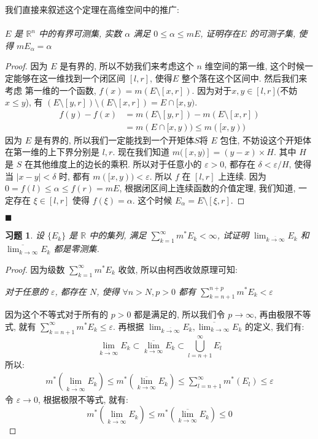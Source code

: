 \documentclass{article}
\newtheorem{exercise}{习题}
\newenvironment{solve}{{\flushleft\textit{解.}}}{\hfill $\blacksquare$}
\begin{document}
\begin{solve}
  我们直接来叙述这个定理在高维空间中的推广:
  \paragraph{}\emph{$E$ 是 $\mathbb{R}^n$ 中的有界可测集, 实数 $\alpha$ 满足 $0\leq \alpha\leq mE$, 证明存在$E$ 的可测子集, 使得 $mE_\alpha = \alpha$} 
  \begin{proof}
    因为 $E$ 是有界的, 所以不妨我们来考虑这个 $n$ 维空间的第一维, 这个时候一定能够在这一维找到一个闭区间 $[l, r]$, 使得$E$ 整个落在这个区间中.
    然后我们来考虑 第一维的一个函数, $f(x) = m(E\setminus [x, r])$.
    因为对于$x, y \in [l, r]$(不妨 $x \leq y$), 有 $(E\setminus[y, r]) \setminus (E\setminus[x, r]) = E\cap [x, y)$.
    \begin{align*}
      f(y) - f(x) &= m(E\setminus[y, r]) - m(E\setminus [x, r]) \\
      &= m(E\cap [x, y)) \leq m([x, y))
    \end{align*}
    因为 $E$ 是有界的, 所以我们一定能找到一个开矩体$S$将 $E$ 包住, 不妨设这个开矩体在第一维的上下界分别是 $l, r$.
    现在我们知道 $m([x, y)] = (y - x) \times H$. 其中 $H$ 是 $S$ 在其他维度上的边长的乘积. 所以对于任意小的 $\varepsilon > 0$, 都存在 $\delta < \varepsilon / H$, 使得当 $|x - y| < \delta$ 时, 都有 $m([x, y)) < \varepsilon$. 所以 $f$ 在 $[l, r]$ 上连续.
    因为 $0 = f(l) \leq \alpha \leq f(r) = mE$, 根据闭区间上连续函数的介值定理, 我们知道, 一定存在 $\xi\in [l, r]$ 使得 $f(\xi) = \alpha$. 这个时候 $E_\alpha = E\setminus [\xi, r]$.
  \end{proof}
\end{solve}
\begin{exercise}
  设 $\{E_k\}$ 是 $\mathbb{R}$ 中的集列, 满足 $\sum_{k=1}^\infty m^*E_k < \infty$, 试证明 $ \lim_{\overline{k\to\infty}} E_k$ 和 $ \overline{\lim_{k\to\infty}} E_k$ 都是零测集.
\end{exercise}
\begin{proof}
  因为级数 $\sum_{k=1}^\infty m^*E_k$ 收敛, 所以由柯西收敛原理可知: 

  \emph{对于任意的 $\varepsilon$,  都存在 $N$, 使得 $\forall n > N, p > 0$ 都有 $\sum_{k = n+1}^{n+p} m^*E_k < \varepsilon$} 

  因为这个不等式对于所有的 $p > 0$ 都是满足的, 所以我们令 $p\to \infty$, 再由极限不等式, 就有 $\sum_{k = n+1}^\infty m^*E_k \leq \varepsilon$.
  再根据 $\lim_{\overline{k\to\infty}}E_k , \overline{\lim_{k\to\infty}}E_k$ 的定义, 我们有:
  \[\lim_{\overline{k\to\infty}}E_k \subset \overline{\lim_{k\to\infty}}E_k \subset \bigcup_{l=n+1}^\infty E_l\]
  所以:
  \begin{align*}
    m^*(\lim_{\overline{k\to\infty}}E_k) \leq m^*(\overline{\lim_{k\to\infty}}E_k) \leq \sum_{l=n+1}^\infty m^*(E_l) \leq \varepsilon
  \end{align*}
  令 $\varepsilon\to 0$, 根据极限不等式, 就有:
  \[m^*(\lim_{\overline{k\to\infty}}E_k) \leq m^*(\overline{\lim_{k\to\infty}}E_k) \leq 0\]
\end{proof}
\end{document}
